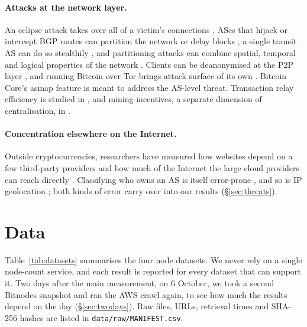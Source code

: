 \documentclass[10pt,a4paper]{article}
\begin{document}
\paragraph{Attacks at the network layer.} An eclipse attack takes over all of a victim's connections \cite{heilman2015eclipse}. ASes that hijack or intercept BGP routes can partition the network or delay blocks \cite{apostolaki2017hijacking}, a single transit AS can do so stealthily \cite{tran2020erebus}, and partitioning attacks can combine spatial, temporal and logical properties of the network \cite{saad2019partitioning}. Clients can be deanonymised at the P2P layer \cite{biryukov2014deanon}, and running Bitcoin over Tor brings attack surface of its own \cite{biryukov2015tor}. Bitcoin Core's asmap feature is meant to address the AS-level threat. Transaction relay efficiency is studied in \cite{naumenko2019erlay}, and mining incentives, a separate dimension of centralisation, in \cite{eyal2018majority}.

\paragraph{Concentration elsewhere on the Internet.} Outside cryptocurrencies, researchers have measured how websites depend on a few third-party providers \cite{kashaf2020thirdparty} and how much of the Internet the large cloud providers can reach directly \cite{arnold2020cloud}. Classifying who owns an AS is itself error-prone \cite{ziv2021asdb}, and so is IP geolocation \cite{poese2011geoloc}; both kinds of error carry over into our results (\S\ref{sec:threats}).

\section{Data}\label{sec:data}

Table~\ref{tab:datasets} summarises the four node datasets. We never rely on a single node-count service, and each result is reported for every dataset that can support it. Two days after the main measurement, on 6 October, we took a second Bitnodes snapshot and ran the AWS crawl again, to see how much the results depend on the day (\S\ref{sec:twodays}). Raw files, URLs, retrieval times and SHA-256 hashes are listed in \texttt{data/raw/MANIFEST.csv}.
\end{document}
